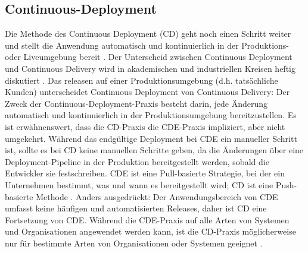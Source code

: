 \subsection{Continuous-Deployment}
Die Methode des Continuous Deployment (CD) geht noch einen Schritt weiter und stellt die Anwendung automatisch und kontinuierlich in der Produktions- oder Liveumgebung bereit \cite{weber2016developing}. Der Unterscheid zwischen Continuous Deployment und Continuous Delivery wird in akademischen und industriellen Kreisen heftig diskutiert \cite{fitzgerald2017continuous, weber2016developing, humble2010continuous}. Das releasen auf einer Produktionsumgebung (d.h. tatsächliche Kunden) unterscheidet Continuous Deployment von Continuous Delivery: Der Zweck der Continuous-Deployment-Praxis besteht darin, jede Änderung automatisch und kontinuierlich in der Produktionsumgebung bereitzustellen. Es ist erwähnenswert, dass die CD-Praxis die CDE-Praxis impliziert, aber nicht umgekehrt. Während das endgültige Deployment bei CDE ein manueller Schritt ist, sollte es bei CD keine manuellen Schritte geben, da die Änderungen über eine Deployment-Pipeline in der Produktion bereitgestellt werden, sobald die Entwickler sie festschreiben. CDE ist eine Pull-basierte Strategie, bei der ein Unternehmen bestimmt, was und wann es bereitgestellt wird; CD ist eine Push-basierte Methode \cite{skelton2016continuous}. Anders ausgedrückt: Der Anwendungsbereich von CDE umfasst keine häufigen und automatisierten Releases, daher ist CD eine Fortsetzung von CDE. Während die CDE-Praxis auf alle Arten von Systemen und Organisationen angewendet werden kann, ist die CD-Praxis möglicherweise nur für bestimmte Arten von Organisationen oder Systemen geeignet \cite{humble2010continuous, skelton2016continuous, shahin2017continuous}.



